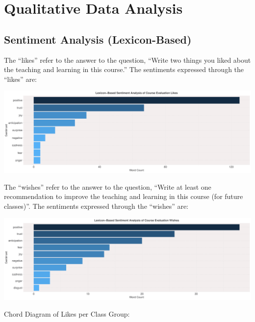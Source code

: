 \documentclass[
]{article}
\begin{document}
\newpage

\section{Qualitative Data Analysis}\label{qualitative-data-analysis}

\subsection{Sentiment Analysis
(Lexicon-Based)}\label{sentiment-analysis-lexicon-based}

The ``likes'' refer to the answer to the question, ``Write two things
you liked about the teaching and learning in this course.'' The
sentiments expressed through the ``likes'' are:

\includegraphics{10.b.BBT4206-End-SemesterCourseEvaluation-20230821-20231128-BI2-BBIT4-2_files/figure-latex/OverallSentimentForLikes-1.pdf}

The ``wishes'' refer to the answer to the question, ``Write at least one
recommendation to improve the teaching and learning in this course (for
future classes)''. The sentiments expressed through the ``wishes'' are:

\includegraphics{10.b.BBT4206-End-SemesterCourseEvaluation-20230821-20231128-BI2-BBIT4-2_files/figure-latex/OverallSentimentForWishes-1.pdf}

\newpage

Chord Diagram of Likes per Class Group:
\end{document}
